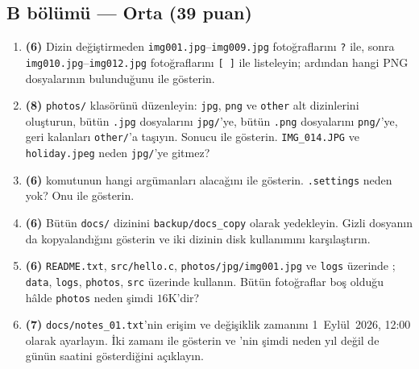 \subsection*{B bölümü --- Orta (39 puan)}
\begin{enumerate}[leftmargin=2.2em,label=\textbf{\arabic*.},start=8]
  \item \textbf{(6)} Dizin değiştirmeden \texttt{img001.jpg}--\texttt{img009.jpg} fotoğraflarını \texttt{?} ile, sonra \texttt{img010.jpg}--\texttt{img012.jpg} fotoğraflarını \texttt{[\,]} ile listeleyin; ardından hangi PNG dosyalarının bulunduğunu  ile gösterin.
  \item \textbf{(8)} \texttt{photos/} klasörünü düzenleyin: \texttt{jpg}, \texttt{png} ve \texttt{other} alt dizinlerini oluşturun, bütün \texttt{.jpg} dosyalarını \texttt{jpg/}'ye, bütün \texttt{.png} dosyalarını \texttt{png/}'ye, geri kalanları \texttt{other/}'a taşıyın. Sonucu  ile gösterin. \texttt{IMG\_014.JPG} ve \texttt{holiday.jpeg} neden \texttt{jpg/}'ye gitmez?
  \item \textbf{(6)}  komutunun hangi argümanları alacağını  ile gösterin. \texttt{.settings} neden yok? Onu  ile gösterin.
  \item \textbf{(6)} Bütün \texttt{docs/} dizinini \texttt{backup/docs\_copy} olarak yedekleyin. Gizli dosyanın da kopyalandığını gösterin ve iki dizinin disk kullanımını karşılaştırın.
  \item \textbf{(6)} \texttt{README.txt}, \texttt{src/hello.c}, \texttt{photos/jpg/img001.jpg} ve \texttt{logs} üzerinde ; \texttt{data}, \texttt{logs}, \texttt{photos}, \texttt{src} üzerinde  kullanın. Bütün fotoğraflar boş olduğu hâlde \texttt{photos} neden şimdi $16$K'dir?
  \item \textbf{(7)} \texttt{docs/notes\_01.txt}'nin erişim ve değişiklik zamanını 1~Eylül~2026, 12:00 olarak ayarlayın. İki zamanı  ile gösterin ve 'nin şimdi neden yıl değil de günün saatini gösterdiğini açıklayın.
\end{enumerate}

